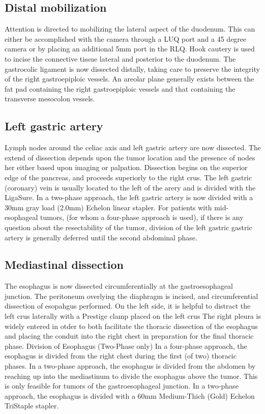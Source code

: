 \documentclass[
]{book}
\begin{document}
\hypertarget{distal-mobilization}{%
\subsection{Distal mobilization}\label{distal-mobilization}}

Attention is directed to mobilizing the lateral aspect of the duodenum. This can either be accomplished with the camera through a LUQ port and a 45 degree camera or by placing an additional 5mm port in the RLQ. Hook cautery is used to incise the connective tissue lateral and posterior to the duodenum. The gastrocolic ligament is now dissected distally, taking care to preserve the integrity of the right gastroepiploic vessels. An areolar plane generally exists between the fat pad containing the right gastroepiploic vessels and that containing the transverse mesocolon vessels.

\hypertarget{left-gastric-artery}{%
\subsection{Left gastric artery}\label{left-gastric-artery}}

Lymph nodes around the celiac axis and left gastric artery are now dissected. The extend of dissection depends upon the tumor location and the presence of nodes her either based upon imaging or palpation. Dissection begins on the superior edge of the pancreas, and proceeds superiorly to the right crus. The left gastric (coronary) vein is usually located to the left of the arery and is divided with the LigaSure. In a two-phase approach, the left gastric artery is now divided with a 30mm gray load (2.0mm) Echelon linear stapler. For patients with mid-esophageal tumors, (for whom a four-phase approach is used), if there is any question about the resectability of the tumor, division of the left gastric gastric artery is generally deferred until the second abdominal phase.

\hypertarget{mediastinal-dissection}{%
\subsection{Mediastinal dissection}\label{mediastinal-dissection}}

The esophagus is now dissected circumferentially at the gastroesophageal junction. The peritoneum overlying the diaphragm is incised, and circumferential dissection of esopahgus performed. On the left side, it is helpful to distract the left crus laterally with a Prestige clamp placed on the left crus The right pleura is widely entered in otder to both facilitate the thoracic dissection of the esophagus and placing the conduit into the right chest in preparation for the final thoracic phase. Division of Esophagus (Two-Phase only) In a four-phase approach, the esophagus is divided from the right chest during the first (of two) thoracic phases. In a two-phase approach, the esophagus is divided from the abdomen by reaching up into the mediastinum to divide the esophagus above the tumor. This is only feasible for tumors of the gastroesophageal junction. In a two-phase approach, the esophagus is divided with a 60mm Medium-Thich (Gold) Echelon TriStaple stapler.
\end{document}
